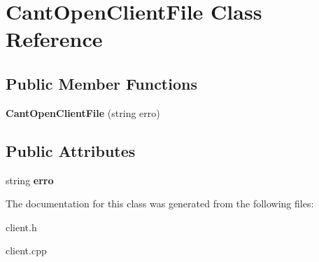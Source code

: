 \hypertarget{class_cant_open_client_file}{}\section{Cant\+Open\+Client\+File Class Reference}
\label{class_cant_open_client_file}
\subsection*{Public Member Functions}
\begin{DoxyCompactItemize}
\item 
\mbox{\label{class_cant_open_client_file_a6190eccfaac3cb2f65f3cfd000ed5fb6}} 
{\bfseries Cant\+Open\+Client\+File} (string erro)
\end{DoxyCompactItemize}
\subsection*{Public Attributes}
\begin{DoxyCompactItemize}
\item 
\mbox{\label{class_cant_open_client_file_aa4aa82cf39a9e960a76d32da6d379b05}} 
string {\bfseries erro}
\end{DoxyCompactItemize}


The documentation for this class was generated from the following files\+:\begin{DoxyCompactItemize}
\item 
client.\+h\item 
client.\+cpp\end{DoxyCompactItemize}
